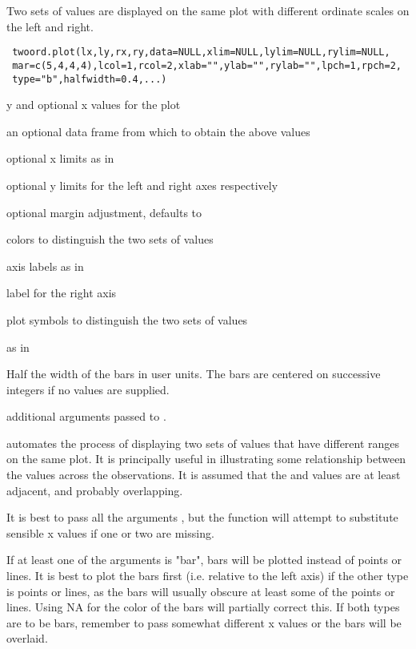 \begin{Description}\relax
Two sets of values are displayed on the same plot with different ordinate
scales on the left and right.
\end{Description}
\begin{Usage}
\begin{verbatim}
 twoord.plot(lx,ly,rx,ry,data=NULL,xlim=NULL,lylim=NULL,rylim=NULL,
 mar=c(5,4,4,4),lcol=1,rcol=2,xlab="",ylab="",rylab="",lpch=1,rpch=2,
 type="b",halfwidth=0.4,...)
\end{verbatim}
\end{Usage}
\begin{Arguments}
\begin{ldescription}
\item[\code{lx,ly,rx,ry}] y and optional x values for the plot
\item[\code{data}] an optional data frame from which to obtain the above values
\item[\code{xlim}] optional x limits as in 
\item[\code{lylim,rylim}] optional y limits for the left and right axes
respectively
\item[\code{mar}] optional margin adjustment, defaults to 
\item[\code{lcol,rcol}] colors to distinguish the two sets of values
\item[\code{xlab,ylab}] axis labels as in 
\item[\code{rylab}] label for the right axis
\item[\code{lpch,rpch}] plot symbols to distinguish the two sets of values
\item[\code{type}] as in 
\item[\code{halfwidth}] Half the width of the bars in user units. The bars are
centered on successive integers if no  values are supplied.
\item[\code{...}] additional arguments passed to .
\end{ldescription}
\end{Arguments}
\begin{Details}\relax
{} automates the process of displaying two sets of
values that have different ranges on the same plot. It is principally
useful in illustrating some relationship between the values across the
observations. It is assumed that the  and  values
are at least adjacent, and probably overlapping.

It is best to pass all the arguments , but the
function will attempt to substitute sensible x values if one or two
are missing.

If at least one of the  arguments is "bar", bars will be plotted instead of
points or lines. It is best to plot the bars first (i.e. relative to the left axis)
if the other type is points or lines, as the bars will usually obscure at least some
of the points or lines. Using NA for the color of the bars will partially correct
this. If both types are to be bars, remember to pass somewhat different x values or
the bars will be overlaid.
\end{Details}
